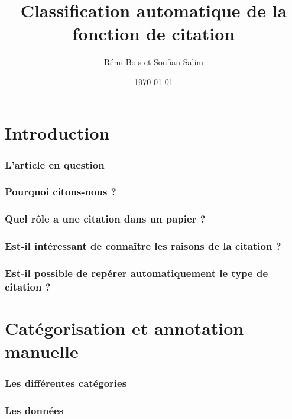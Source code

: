 \documentclass[10pt]{beamer}
\title{Classification automatique de la fonction de citation}
\author{Rémi Bois et Soufian Salim}
\date{\today}
\begin{document}
\begin{frame}
  \maketitle
\end{frame}

\section{Introduction}
\label{sec:intro}

\begin{frame}
  \frametitle{L'article en question}
\end{frame}

\begin{frame}
  \frametitle{Pourquoi citons-nous ?}
\end{frame}

\begin{frame}
  \frametitle{Quel rôle a une citation dans un papier ?}
\end{frame}

\begin{frame}
  \frametitle{Est-il intéressant de connaître les raisons de la
    citation ?}
\end{frame}

\begin{frame}
  \frametitle{Est-il possible de repérer automatiquement le type de
    citation ?}
\end{frame}


\section{Catégorisation et annotation manuelle}
\label{sec:catandmanual}


\begin{frame}
  \frametitle{Les différentes catégories}
\end{frame}

\begin{frame}
  \frametitle{Les données}
\end{frame}
\end{document}
